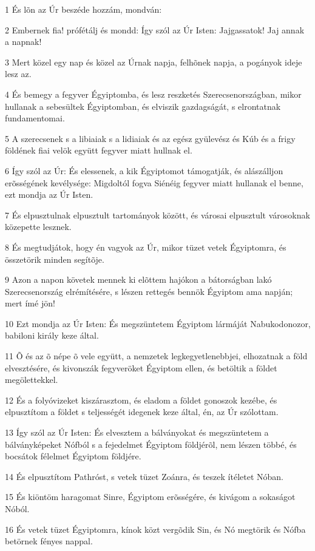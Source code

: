\par 1 És lõn az Úr beszéde hozzám, mondván:
\par 2 Embernek fia! prófétálj és mondd: Így szól az Úr Isten: Jajgassatok! Jaj annak a napnak!
\par 3 Mert közel egy nap és közel az Úrnak napja, felhõnek napja, a pogányok ideje lesz az.
\par 4 És bemegy a fegyver Égyiptomba, és lesz reszketés Szerecsenországban, mikor hullanak a sebesültek Égyiptomban, és elviszik gazdagságát, s elrontatnak fundamentomai.
\par 5 A szerecsenek s a libiaiak s a lidiaiak és az egész gyülevész és Kúb és a frigy földének fiai velök együtt fegyver miatt hullnak el.
\par 6 Így szól az Úr: És elessenek, a kik Égyiptomot támogatják, és alászálljon erõsségének kevélysége: Migdoltól fogva Siénéig fegyver miatt hullanak el benne, ezt mondja az Úr Isten.
\par 7 És elpusztulnak elpusztult tartományok között, és városai elpusztult városoknak közepette lesznek.
\par 8 És megtudjátok, hogy én vagyok az Úr, mikor tüzet vetek Égyiptomra, és összetörik minden segítõje.
\par 9 Azon a napon követek mennek ki elõttem hajókon a bátorságban lakó Szerecsenország elrémítésére, s lészen rettegés bennök Égyiptom ama napján; mert ímé jön!
\par 10 Ezt mondja az Úr Isten: És megszüntetem Égyiptom lármáját Nabukodonozor, babiloni király keze által.
\par 11 Õ és az õ népe õ vele együtt, a nemzetek legkegyetlenebbjei, elhozatnak a föld elvesztésére, és kivonszák fegyveröket Égyiptom ellen, és betöltik a földet megölettekkel.
\par 12 És a folyóvizeket kiszárasztom, és eladom a földet gonoszok kezébe, és elpusztítom a földet s teljességét idegenek keze által, én, az Úr szólottam.
\par 13 Így szól az Úr Isten: És elvesztem a bálványokat és megszüntetem a bálványképeket Nófból s a fejedelmet Égyiptom földjérõl, nem lészen többé, és bocsátok félelmet Égyiptom földjére.
\par 14 És elpusztítom Pathróst, s vetek tüzet Zoánra, és teszek ítéletet Nóban.
\par 15 És kiöntöm haragomat Sinre, Égyiptom erõsségére, és kivágom a sokaságot Nóból.
\par 16 És vetek tüzet Égyiptomra, kínok közt vergõdik Sin, és Nó megtörik és Nófba betörnek fényes nappal.
